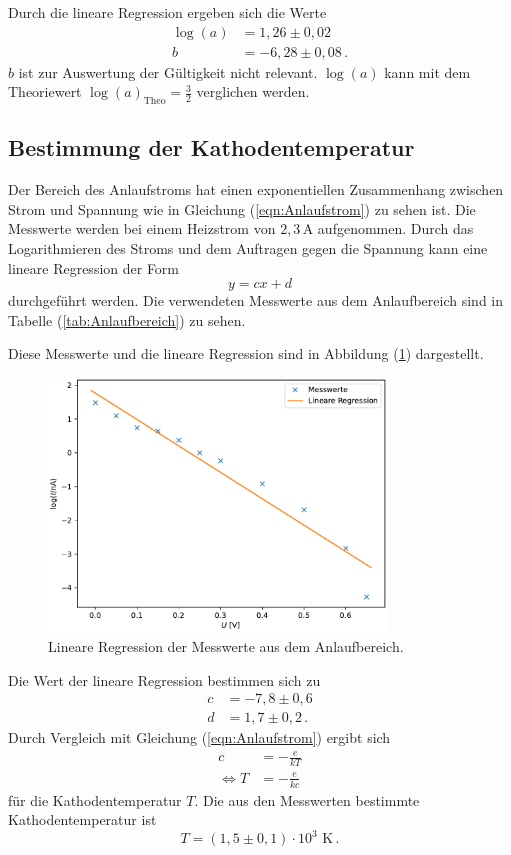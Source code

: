 Durch die lineare Regression ergeben sich 
die Werte
\begin{align}
    \log(a) &= 1,26 \pm 0,02 \\
    b &= -6,28 \pm 0,08 \, .
\end{align}
$b$ ist zur Auswertung der Gültigkeit nicht relevant. $\log(a)$ kann mit dem Theoriewert $\log(a)_{\text{Theo}}= \frac{3}{2}$ verglichen werden.

\subsection{Bestimmung der Kathodentemperatur}
Der Bereich des Anlaufstroms hat einen exponentiellen Zusammenhang zwischen Strom und 
Spannung wie in Gleichung (\ref{eqn:Anlaufstrom}) zu sehen ist. Die Messwerte werden bei einem Heizstrom
von $2,3 \,\unit{\ampere}$ aufgenommen. Durch das Logarithmieren des Stroms 
und dem Auftragen gegen die Spannung kann eine lineare Regression der Form 
$$y = cx + d$$
durchgeführt werden. Die verwendeten Messwerte aus dem Anlaufbereich sind in Tabelle (\ref{tab:Anlaufbereich}) zu sehen. 

Diese Messwerte und die lineare Regression sind in Abbildung (\ref{fig:plot_3}) dargestellt. 
\begin{figure}
    \centering
    \includegraphics[width=0.8\textwidth]{plot_4.pdf}
    \caption{Lineare Regression der Messwerte aus dem Anlaufbereich.}
    \label{fig:plot_3}
\end{figure}
Die Wert der lineare Regression bestimmen sich zu 
\begin{align*}
    c &= -7,8 \pm 0,6 \\
    d &= 1,7 \pm 0,2 \, .
\end{align*}
Durch Vergleich mit Gleichung (\ref{eqn:Anlaufstrom}) ergibt sich 
\begin{align*}
    c &= -\frac{e}{kT} \\
    \Leftrightarrow T &= -\frac{e}{kc}
\end{align*}
für die Kathodentemperatur $T$. 
Die aus den Messwerten bestimmte Kathodentemperatur ist 
$$ T = (1,5 \pm 0,1)\cdot 10^{3} \, \, \unit{\kelvin}\,.$$

